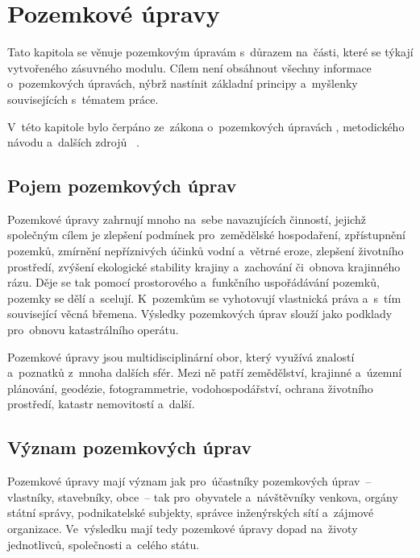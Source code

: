 \chapter{Pozemkové úpravy}
\label{pu}

Tato kapitola se věnuje pozemkovým úpravám s~důrazem na~části, které se týkají vytvořeného zásuvného modulu. Cílem není obsáhnout všechny informace o~pozemkových úpravách, nýbrž nastínit základní principy a~myšlenky souvisejících s~tématem práce.

V~této kapitole bylo čerpáno ze~zákona o~pozemkových úpravách \citep{pu_zakon}, metodic\-kého návodu \citep{metodicky_navod} a~dalších zdrojů \citep{pu_cr}~\citep{pu_skripta}.

\section{Pojem pozemkových úprav}
\label{pojem_pu}

Pozemkové úpravy zahrnují mnoho na~sebe navazujících činností, jejichž společným cílem je zlepšení podmínek pro~zemědělské hospodaření, zpřístupnění pozemků, zmírnění nepříznivých účinků vodní a~větrné eroze, zlepšení životního prostředí, zvýšení ekologické stability krajiny a~zachování či~obnova krajinného rázu. Děje se tak pomocí prostorového a~funkčního uspořádávání pozemků, pozemky se dělí a~scelují. K~pozemkům se vyhotovují vlastnická práva a~s~tím související věcná břemena. Výsledky pozemkových úprav slouží jako podklady pro~obnovu katastrálního operátu.

Pozemkové úpravy jsou multidisciplinární obor, který využívá znalostí a~poznatků z~mnoha dalších sfér. Mezi ně patří zemědělství, krajinné a~územní plánování, geodézie, fotogrammetrie, vodohospodářství, ochrana životního prostředí, katastr nemovitostí a~další.

\section{Význam pozemkových úprav}
\label{vyznam_pu}

Pozemkové úpravy mají význam jak pro~účastníky pozemkových úprav~– vlastníky, stavebníky, obce~– tak pro~obyvatele a~návštěvníky venkova, orgány státní správy, podnikatelské subjekty, správce inženýrských sítí a~zájmové organizace. Ve~výsledku mají tedy pozemkové úpravy dopad na~životy jednotlivců, společnosti a~celého státu.

